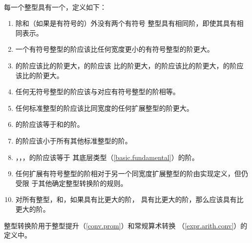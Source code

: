 \paragraph{} %
每一个整型具有一个，定义如下：
\begin{enumerate}
  \item 除和（如果是有符号的）外没有两个有符号
        整型具有相同阶，即使其具有相同表示。
  \item 一个有符号整型的阶应该比任何宽度更小的有符号整型的阶更大。
  \item {}的阶应该比的阶更大，的阶应该
        比的阶更大，的阶应该比的阶更大，的阶应该比的阶更大。
  \item 任何无符号整型的阶应该与对应有符号整型的阶相等。
  \item 任何标准整型的阶应该比同宽度的任何扩展整型的阶更大。
  \item {}的阶应该等于和的阶。
  \item {}的阶应该小于所有其他标准整型的阶。
  \item {}，，，的阶应该等于
        其底层类型（\ref{basic.fundamental}）的阶。
  \item 任何扩展有符号整型的阶相对于另一个同宽度扩展整型的阶由实现定义，但仍受限
        于其他确定整型转换阶的规则。
  \item 对所有整型，和，如果具有比更大的阶，
        具有比更大的阶，那么应该具有比更大的阶。
\end{enumerate}

\begin{note}
  整型转换阶用于整型提升（\ref{conv.prom}）和常规算术转换
  （\ref{expr.arith.conv}）的定义中。
\end{note}
